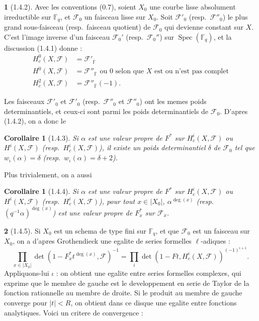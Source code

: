\documentclass[12pt,a4paper]{article}
\theoremstyle{plain}
\newtheorem{corollaire}[theorem]{Corollaire}
\theoremstyle{definition}
\theoremstyle{definition}
\newtheorem{para}{}[section]
\theoremstyle{remark}
\DeclareMathOperator{\Spec}{Spec}
\begin{document}
\begin{para}[1.4.2]
Avec les conventions (0.7), soient $X_0$ une courbe lisse absolument irreductible sur $\mathbb{F}_q$, et $\mathscr{F}_0$ un faisceau lisse sur $X_0$. Soit $\mathscr{F}'_0$ (resp.~$\mathscr{F}''_0$) le plus grand sous-faisceau (resp.~faisceau quotient) de $\mathscr{F}_0$ qui devienne constant sur $X$. C'est l'image inverse d'un faisceau $\mathscr{F}_0'$ (resp.~$\mathscr{F}_0''$) sur $\Spec(\mathbb{F}_q)$, et la discussion (1.4.1) donne :
\begin{align}
H_c^0(X, \mathscr{F}) &= \mathscr{F}'_{\overline{\mathbb{F}}} \tag{1.4.2.1}\\
H^0(X, \mathscr{F}) &= \mathscr{F}''_{\overline{\mathbb{F}}} \text{ ou } 0 \text{ selon que $X$ est ou n'est pas complet} \tag{1.4.2.2}\\
H_c^2(X, \mathscr{F}) &= \mathscr{F}''_{\overline{\mathbb{F}}}(-1). \tag{1.4.2.3}
\end{align}

Les faisceaux $\mathscr{F}'_0$ et $\mathscr{F}'_0$ (resp.~$\mathscr{F}''_0$ et $\mathscr{F}''_0$) ont les memes poids determinantiels, et ceux-ci sont parmi les poids determinantiels de $\mathscr{F}_0$. D'apres (1.4.2), on a donc le
\end{para}

\begin{corollaire}[1.4.3]
Si $\alpha$ est une valeur propre de $F^*$ sur $H_c^i(X, \mathscr{F})$ ou $H^i(X, \mathscr{F})$ (resp.~$H_c^i(X, \mathscr{F})$), il existe un poids determinantiel $\delta$ de $\mathscr{F}_0$ tel que $w_\iota(\alpha) = \delta$ (resp.~$w_\iota(\alpha) = \delta + 2$).
\end{corollaire}

Plus trivialement, on a aussi

\begin{corollaire}[1.4.4]
Si $\alpha$ est une valeur propre de $F^*$ sur $H_c^i(X, \mathscr{F})$ ou $H^i(X, \mathscr{F})$ (resp.~$H_c^i(X, \mathscr{F})$), pour tout $x \in |X_0|$, $\alpha^{\deg(x)}$ (resp.~$(q^{-1}\alpha)^{\deg(x)}$) est une valeur propre de $F_x^*$ sur $\mathscr{F}_{\overline{x}}$.
\end{corollaire}

\begin{para}[1.4.5]
Si $X_0$ est un schema de type fini sur $\mathbb{F}_q$, et que $\mathscr{F}_0$ est un faisceau sur $X_0$, on a d'apres Grothendieck une egalite de series formelles $\ell$-adiques :
\begin{equation}\tag{1.4.5.1}
\prod_{x \in |X_0|} \det(1 - F_x^* t^{\deg(x)}, \mathscr{F})^{-1} = \prod_i \det(1 - Ft, H_c^i(X, \mathscr{F}))^{(-1)^{i+1}}.
\end{equation}
Appliquons-lui $\iota$ : on obtient une egalite entre series formelles complexes, qui exprime que le membre de gauche est le developpement en serie de Taylor de la fonction rationnelle au membre de droite. Si le produit au membre de gauche converge pour $|t| < R$, on obtient dans ce disque une egalite entre fonctions analytiques. Voici un critere de convergence :
\end{para}
\end{document}
